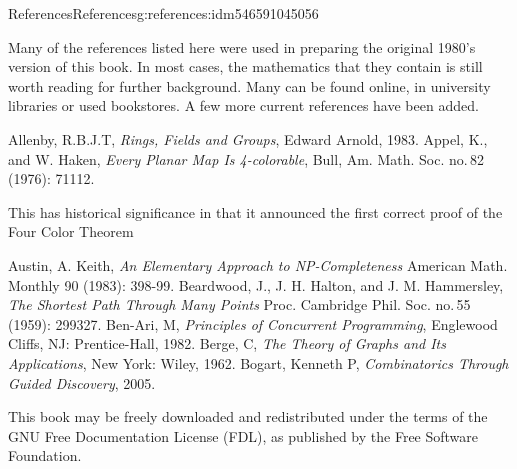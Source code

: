 \documentclass[oneside,10pt,]{book}
\numberwithin{equation}{section}
\begin{document}
%
\begin{references-chapter-numberless}{References}{}{References}{}{}{g:references:idm546591045056}
%
\begin{introduction}{}%
Many of the references listed here were used in preparing the original 1980's version of this book.  In most cases, the mathematics that they contain is still worth reading for further background. Many can be found online, in university libraries or used bookstores.  A few more current references have been added.%
\end{introduction}%
\begin{referencelist}
\hypertarget{x:biblio:biblio-allenby-1983}{}Allenby, R.B.J.T, \textit{Rings, Fields and Groups}, Edward Arnold, 1983.
\hypertarget{x:biblio:biblio-appel-1976}{}Appel, K., and W. Haken, \textit{Every Planar Map Is 4-colorable},  Bull, Am. Math. Soc. no.\@\,82 (1976): 711\textendash{}12.\par%
This has historical significance in that it announced the first correct proof of the Four Color Theorem%

\hypertarget{x:biblio:biblio-austin-1983}{}Austin, A. Keith, \textit{An Elementary Approach to NP-Completeness} American Math. Monthly 90 (1983): 398-99.
\hypertarget{x:biblio:biblio-beardwood-1959}{}Beardwood, J., J. H. Halton, and J. M. Hammersley, \textit{The Shortest Path Through Many Points} Proc. Cambridge Phil. Soc. no.\@\,55 (1959): 299\textendash{}327.
\hypertarget{x:biblio:biblio-benari-1982}{}Ben-Ari, M, \textit{Principles of Concurrent Programming}, Englewood Cliffs, NJ: Prentice-Hall, 1982.
\hypertarget{x:biblio:biblio-berge-1962}{}Berge, C, \textit{The Theory of Graphs and Its Applications}, New York: Wiley, 1962.
\hypertarget{x:biblio:biblio-bogart-2005}{}Bogart, Kenneth P, \textit{Combinatorics Through Guided Discovery},  2005.\par%
This book may be freely downloaded and redistributed   under the terms of the GNU Free Documentation License (FDL), as published by the Free Software Foundation.%


\end{referencelist}
\end{references-chapter-numberless}
\end{document}
